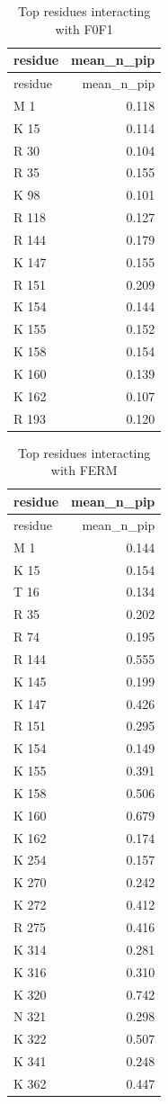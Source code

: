 \documentclass[
  twocolumn]{biophys-new-mod}
\begin{document}
\hypertarget{tbl-f0f1-top-interacting}{}
\begin{longtable}[]{@{}lr@{}}
\caption{\label{tbl-f0f1-top-interacting}Top residues interacting with
F0F1}\tabularnewline
\toprule()
residue & mean\_n\_pip \\
\midrule()
\endfirsthead
\toprule()
residue & mean\_n\_pip \\
\midrule()
\endhead
M 1 & 0.118 \\
K 15 & 0.114 \\
R 30 & 0.104 \\
R 35 & 0.155 \\
K 98 & 0.101 \\
R 118 & 0.127 \\
R 144 & 0.179 \\
K 147 & 0.155 \\
R 151 & 0.209 \\
K 154 & 0.144 \\
K 155 & 0.152 \\
K 158 & 0.154 \\
K 160 & 0.139 \\
K 162 & 0.107 \\
R 193 & 0.120 \\
\bottomrule()
\end{longtable}

\hypertarget{tbl-ferm-top-interacting}{}
\begin{longtable}[]{@{}lr@{}}
\caption{\label{tbl-ferm-top-interacting}Top residues interacting with
FERM}\tabularnewline
\toprule()
residue & mean\_n\_pip \\
\midrule()
\endfirsthead
\toprule()
residue & mean\_n\_pip \\
\midrule()
\endhead
M 1 & 0.144 \\
K 15 & 0.154 \\
T 16 & 0.134 \\
R 35 & 0.202 \\
R 74 & 0.195 \\
R 144 & 0.555 \\
K 145 & 0.199 \\
K 147 & 0.426 \\
R 151 & 0.295 \\
K 154 & 0.149 \\
K 155 & 0.391 \\
K 158 & 0.506 \\
K 160 & 0.679 \\
K 162 & 0.174 \\
K 254 & 0.157 \\
K 270 & 0.242 \\
K 272 & 0.412 \\
R 275 & 0.416 \\
K 314 & 0.281 \\
K 316 & 0.310 \\
K 320 & 0.742 \\
N 321 & 0.298 \\
K 322 & 0.507 \\
K 341 & 0.248 \\
K 362 & 0.447 \\
\bottomrule()
\end{longtable}
\end{document}
